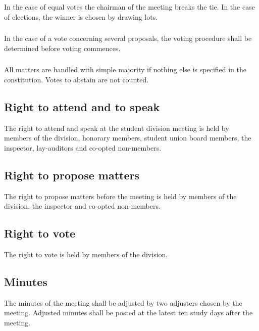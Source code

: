 \documentclass[a4paper]{dtek}
\begin{document}
\subsubsection{}
In the case of equal votes the chairman of the meeting breaks the tie. In the case of elections, the winner is chosen by drawing lots.

\subsubsection{}
In the case of a vote concerning several proposals, the voting procedure shall be determined before voting commences.

\subsubsection{}
All matters are handled with simple majority if nothing else is specified in the constitution. Votes to abstain are not counted. 

\subsection{Right to attend and to speak}
The right to attend and speak at the student division meeting is held by members of the division, honorary members, student union board members, the inspector, lay-auditors and co-opted non-members. 

\subsection{Right to propose matters}
The right to propose matters before the meeting is held by members of the division, the inspector and co-opted non-members. 

\subsection{Right to vote}
The right to vote is held by members of the division. 

\subsection{Minutes}
The minutes of the meeting shall be adjusted by two adjusters chosen by the meeting. Adjusted minutes shall be posted at the latest ten study days after the meeting. 

\newpage

\end{document}
